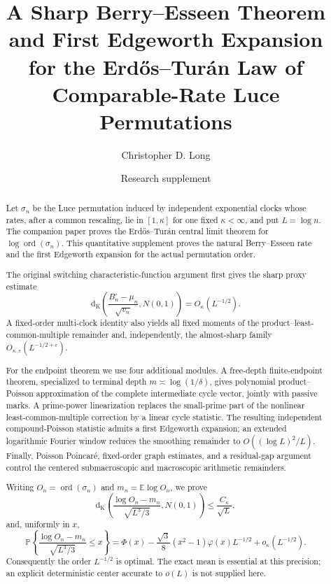 \documentclass[11pt]{article}
\title{A Sharp Berry--Esseen Theorem and First Edgeworth Expansion\\
       for the Erd\H{o}s--Tur\'an Law of Comparable-Rate Luce Permutations}
\author{Christopher D. Long}
\date{Research supplement}
\theoremstyle{remark}
\newcommand{\Pp}{\mathbb P}
\newcommand{\Ee}{\mathbb E}
\newcommand{\ord}{\operatorname{ord}}
\begin{document}
\maketitle

\begin{abstract}
Let $\sigma_n$ be the Luce permutation induced by independent exponential
clocks whose rates, after a common rescaling, lie in $[1,\kappa]$ for one
fixed $\kappa<\infty$, and put $L=\log n$.  The companion paper proves the
Erd\H{o}s--Tur\'an central limit theorem for $\log\ord(\sigma_n)$.  This
quantitative supplement proves the natural Berry--Esseen rate and the first
Edgeworth expansion for the actual permutation order.

The original switching characteristic-function argument first gives the
sharp proxy estimate
\[
 \mathrm d_{\mathrm K}\!\left(
 \frac{B_n^\circ-\mu_n}{\sqrt{v_n}},N(0,1)\right)
 =O_\kappa(L^{-1/2}).
\]
A fixed-order multi-clock identity also yields all fixed moments of the
product--least-common-multiple remainder and, independently, the
almost-sharp family $O_{\kappa,\varepsilon}(L^{-1/2+\varepsilon})$.

For the endpoint theorem we use four additional modules.  A free-depth
finite-endpoint theorem, specialized to terminal depth
$m\asymp\log(1/\delta)$, gives polynomial product--Poisson approximation of
the complete intermediate cycle vector, jointly with passive marks.  A
prime-power linearization replaces the small-prime part of the nonlinear
least-common-multiple correction by a linear cycle statistic.  The resulting
independent compound-Poisson statistic admits a first Edgeworth expansion;
an extended logarithmic Fourier window reduces the smoothing remainder to
$O((\log L)^2/L)$.  Finally, Poisson Poincar\'e, fixed-order graph estimates,
and a residual-gap argument control the centered submacroscopic and
macroscopic arithmetic remainders.

Writing $O_n=\ord(\sigma_n)$ and $m_n=\Ee\log O_n$, we prove
\[
 \mathrm d_{\mathrm K}\!\left(
 \frac{\log O_n-m_n}{\sqrt{L^3/3}},N(0,1)\right)
 \le \frac{C_\kappa}{\sqrt L},
\]
and, uniformly in $x$,
\[
 \Pp\!\left\{
 \frac{\log O_n-m_n}{\sqrt{L^3/3}}\le x
 \right\}
 =\Phi(x)-\frac{\sqrt3}{8}(x^2-1)\varphi(x)L^{-1/2}
 +o_\kappa(L^{-1/2}).
\]
Consequently the order $L^{-1/2}$ is optimal.  The exact mean is essential
at this precision; an explicit deterministic center accurate to $o(L)$ is
not supplied here.
\end{abstract}

\tableofcontents
\end{document}
